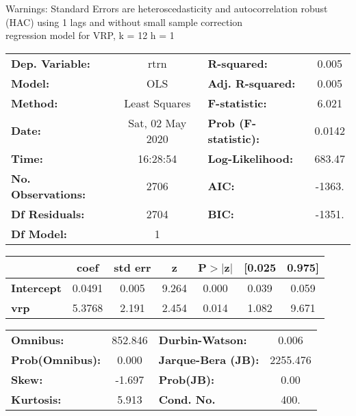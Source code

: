 Warnings: \newline
 [1] Standard Errors are heteroscedasticity and autocorrelation robust (HAC) using 1 lags and without small sample correction\\ 

regression model for VRP, k = 12 h = 1\begin{center}
\begin{tabular}{lclc}
\toprule
\textbf{Dep. Variable:}    &       rtrn       & \textbf{  R-squared:         } &     0.005   \\
\textbf{Model:}            &       OLS        & \textbf{  Adj. R-squared:    } &     0.005   \\
\textbf{Method:}           &  Least Squares   & \textbf{  F-statistic:       } &     6.021   \\
\textbf{Date:}             & Sat, 02 May 2020 & \textbf{  Prob (F-statistic):} &   0.0142    \\
\textbf{Time:}             &     16:28:54     & \textbf{  Log-Likelihood:    } &    683.47   \\
\textbf{No. Observations:} &        2706      & \textbf{  AIC:               } &    -1363.   \\
\textbf{Df Residuals:}     &        2704      & \textbf{  BIC:               } &    -1351.   \\
\textbf{Df Model:}         &           1      & \textbf{                     } &             \\
\bottomrule
\end{tabular}
\begin{tabular}{lcccccc}
                   & \textbf{coef} & \textbf{std err} & \textbf{z} & \textbf{P$> |$z$|$} & \textbf{[0.025} & \textbf{0.975]}  \\
\midrule
\textbf{Intercept} &       0.0491  &        0.005     &     9.264  &         0.000        &        0.039    &        0.059     \\
\textbf{vrp}       &       5.3768  &        2.191     &     2.454  &         0.014        &        1.082    &        9.671     \\
\bottomrule
\end{tabular}
\begin{tabular}{lclc}
\textbf{Omnibus:}       & 852.846 & \textbf{  Durbin-Watson:     } &    0.006  \\
\textbf{Prob(Omnibus):} &   0.000 & \textbf{  Jarque-Bera (JB):  } & 2255.476  \\
\textbf{Skew:}          &  -1.697 & \textbf{  Prob(JB):          } &     0.00  \\
\textbf{Kurtosis:}      &   5.913 & \textbf{  Cond. No.          } &     400.  \\
\bottomrule
\end{tabular}
\end{center}


